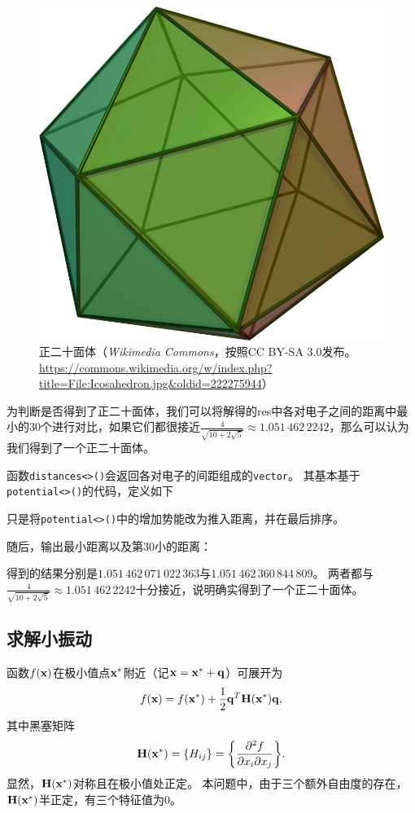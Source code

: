 \begin{figure}
    \centering
    \includegraphics[width=.5\textwidth]{Icosahedron.jpg}
    \caption{正二十面体（\textit{Wikimedia Commons}，按照CC BY-SA 3.0发布。\url{https://commons.wikimedia.org/w/index.php?title=File:Icosahedron.jpg&oldid=222275944}）}
    \label{fig:icosahedron}
\end{figure}

为判断是否得到了正二十面体，我们可以将解得的res中各对电子之间的距离中最小的30个进行对比，如果它们都很接近$\frac{4}{\sqrt{10+2\sqrt{5}}} \approx 1.051\,462\,2242$，那么可以认为我们得到了一个正二十面体。

函数\texttt{distances<>()}会返回各对电子的间距组成的\texttt{vector}。
其基本基于\texttt{potential<>()}的代码，定义如下
{
    \linespread{1.0}
    
}
只是将\texttt{potential<>()}中的增加势能改为推入距离，并在最后排序。

随后，输出最小距离以及第30小的距离：
{
    \linespread{1.0}
    
}
得到的结果分别是$1.051\,462\,071\,022\,363$与$1.051\,462\,360\,844\,809$。
两者都与$\frac{4}{\sqrt{10+2\sqrt{5}}} \approx 1.051\,462\,2242$十分接近，说明确实得到了一个正二十面体。

\subsection{求解小振动}
函数$f(\vb{x})$在极小值点$\vb{x}^*$附近（记$\vb{x} = \vb{x}^* + \vb{q}$）可展开为
\begin{equation}
    f(\vb{x}) = f(\vb{x}^*) + \frac{1}{2}\vb{q}^T\vb{H}(\vb{x}^*)\vb{q},
\end{equation}
其中黑塞矩阵
\begin{equation}
    \vb{H}(\vb{x}^*) = \qty{H_{ij}} = \qty{\pdv{f}{x_i}{x_j}}.
\end{equation}
显然，$\vb{H}(\vb{x}^*)$对称且在极小值处正定。
本问题中，由于三个额外自由度的存在，$\vb{H}(\vb{x}^*)$半正定，有三个特征值为0。


